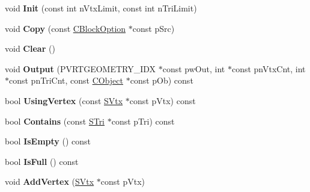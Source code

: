 \begin{DoxyCompactItemize}
\item 
\hypertarget{struct_c_block_option_a6bec9116f3b6c7867b73cf079c283866}{void {\bfseries Init} (const int n\+Vtx\+Limit, const int n\+Tri\+Limit)}\label{struct_c_block_option_a6bec9116f3b6c7867b73cf079c283866}

\item 
\hypertarget{struct_c_block_option_a8a0fe9ae5daa91d31d036a480fb40bee}{void {\bfseries Copy} (const \hyperlink{struct_c_block_option}{C\+Block\+Option} $\ast$const p\+Src)}\label{struct_c_block_option_a8a0fe9ae5daa91d31d036a480fb40bee}

\item 
\hypertarget{struct_c_block_option_a4d43ce82db117545f7d614183c12a8d2}{void {\bfseries Clear} ()}\label{struct_c_block_option_a4d43ce82db117545f7d614183c12a8d2}

\item 
\hypertarget{struct_c_block_option_a9200b74210af92106f6b6dc1207962ef}{void {\bfseries Output} (P\+V\+R\+T\+G\+E\+O\+M\+E\+T\+R\+Y\+\_\+\+I\+D\+X $\ast$const pw\+Out, int $\ast$const pn\+Vtx\+Cnt, int $\ast$const pn\+Tri\+Cnt, const \hyperlink{class_c_object}{C\+Object} $\ast$const p\+Ob) const }\label{struct_c_block_option_a9200b74210af92106f6b6dc1207962ef}

\item 
\hypertarget{struct_c_block_option_aad6388316c68abf8e358d4e0cb036cad}{bool {\bfseries Using\+Vertex} (const \hyperlink{struct_s_vtx}{S\+Vtx} $\ast$const p\+Vtx) const }\label{struct_c_block_option_aad6388316c68abf8e358d4e0cb036cad}

\item 
\hypertarget{struct_c_block_option_a060678d5146632b8eb67b16bdfc2a822}{bool {\bfseries Contains} (const \hyperlink{struct_s_tri}{S\+Tri} $\ast$const p\+Tri) const }\label{struct_c_block_option_a060678d5146632b8eb67b16bdfc2a822}

\item 
\hypertarget{struct_c_block_option_afbefadc620b80cfaf60dc484f782066a}{bool {\bfseries Is\+Empty} () const }\label{struct_c_block_option_afbefadc620b80cfaf60dc484f782066a}

\item 
\hypertarget{struct_c_block_option_a95a436c9ada6996f27804f83c52c761e}{bool {\bfseries Is\+Full} () const }\label{struct_c_block_option_a95a436c9ada6996f27804f83c52c761e}

\item 
\hypertarget{struct_c_block_option_a76349edba58384916a4de25e66d1d418}{void {\bfseries Add\+Vertex} (\hyperlink{struct_s_vtx}{S\+Vtx} $\ast$const p\+Vtx)}\label{struct_c_block_option_a76349edba58384916a4de25e66d1d418}


\end{DoxyCompactItemize}
